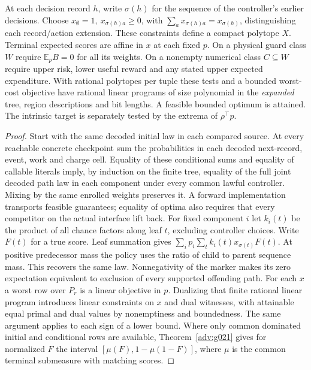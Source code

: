 \begin{theorem}\label{flag:p1}
At each decision record \(h\), write \(\sigma(h)\) for the sequence of the controller's earlier decisions. Choose \(x_\emptyset=1,\ x_{\sigma(h)a}\ge0\), with \(\sum_a x_{\sigma(h)a}=x_{\sigma(h)}\), distinguishing each record/action extension. These constraints define a compact polytope \(X\). Terminal expected scores are affine in \(x\) at each fixed \(p\). On a physical guard class \(W\) require \(\mathbb E_p B=0\) for all its weights. On a nonempty numerical class \(C\subseteq W\) require upper risk, lower useful reward and any stated upper expected expenditure. With rational polytopes per tuple these tests and a bounded worst-cost objective have rational linear programs of size polynomial in the \emph{expanded} tree, region descriptions and bit lengths. A feasible bounded optimum is attained. The intrinsic target is separately tested by the extrema of \(\rho^\top p\).
\end{theorem}
\begin{proof}
Start with the same decoded initial law in each compared source. At every reachable concrete checkpoint sum the probabilities in each decoded next-record, event, work and charge cell. Equality of these conditional sums and equality of callable literals imply, by induction on the finite tree, equality of the full joint decoded path law in each component under every common lawful controller. Mixing by the same enrolled weights preserves it. A forward implementation transports feasible guarantees; equality of optima also requires that every competitor on the actual interface lift back. For fixed component \(i\) let \(k_i(t)\) be the product of all chance factors along leaf \(t\), excluding controller choices. Write \(F(t)\) for a true score. Leaf summation gives \(\sum_i p_i\sum_t k_i(t)x_{\sigma(t)}F(t)\). At positive predecessor mass the policy uses the ratio of child to parent sequence mass. This recovers the same law. Nonnegativity of the marker makes its zero expectation equivalent to exclusion of every supported offending path. For each \(x\) a worst row over \(P_r\) is a linear objective in \(p\). Dualizing that finite rational linear program introduces linear constraints on \(x\) and dual witnesses, with attainable equal primal and dual values by nonemptiness and boundedness. The same argument applies to each sign of a lower bound. Where only common dominated initial and conditional rows are available, Theorem~\ref{adv:g021} gives for normalized \(F\) the interval \([\mu(F),1-\mu(1-F)]\), where \(\mu\) is the common terminal submeasure with matching scores.
\end{proof}

